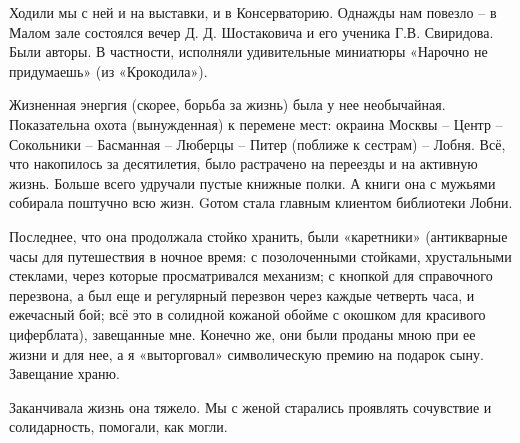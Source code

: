 Ходили мы с ней и на выставки, и в Консерваторию. Однажды нам повезло – в Малом зале состоялся вечер Д. Д. Шостаковича и его ученика Г.В. Свиридова. Были авторы. В частности, исполняли удивительные миниатюры «Нарочно не придумаешь» (из «Крокодила»).

Жизненная энергия (скорее, борьба за жизнь) была у нее необычайная. Показательна охота (вынужденная) к перемене мест: окраина Москвы – Центр –  Сокольники – Басманная – Люберцы – Питер (поближе к сестрам) – Лобня. Всё, что накопилось за десятилетия, было растрачено на переезды и на активную жизнь. Больше всего удручали пустые книжные полки. А книги она с мужьями собирала поштучно всю жизн. Gотом стала главным клиентом библиотеки Лобни.

Последнее, что она продолжала стойко хранить, были «каретники» (антикварные часы для путешествия в ночное время: с позолоченными стойками,  хрустальными стеклами, через которые просматривался механизм; с кнопкой для справочного перезвона, а был еще и регулярный перезвон через каждые четверть часа, и ежечасный бой; всё это в солидной кожаной обойме с окошком для красивого циферблата), завещанные мне. Конечно же, они были проданы мною при ее жизни и для нее, а я «выторговал» символическую премию на подарок сыну. Завещание храню.

Заканчивала жизнь она тяжело. Мы с женой старались проявлять сочувствие и солидарность, помогали, как могли.


